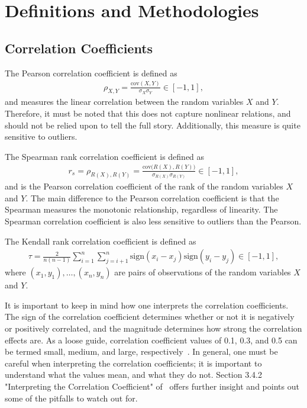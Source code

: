 \chapter{Definitions and Methodologies}
\section{Correlation Coefficients}\label{app:correlation_coefficients}
The Pearson correlation coefficient is defined as
\begin{align}
    \rho_{X,Y} = \frac{\text{cov}{(X,Y)}}{\sigma_X \sigma_Y} \in [-1, 1],
\end{align}
and measures the linear correlation between the random variables \( X \) and \( Y \).
Therefore, it must be noted that this does not capture nonlinear relations, and should not be relied upon to tell the full story.
Additionally, this measure is quite sensitive to outliers.

The Spearman rank correlation coefficient is defined as
\begin{align}
    r_s = \rho_{R(X),R(Y)} = \frac{\text{cov}{\big(R(X),R(Y)\big)}}{\sigma_{R(X)} \sigma_{R(Y)}} \in [-1, 1],
\end{align}
and is the Pearson correlation coefficient of the rank of the random variables \( X \) and \( Y \).
The main difference to the Pearson correlation coefficient is that the Spearman measures the monotonic relationship, regardless of linearity.
The Spearman correlation coefficient is also less sensitive to outliers than the Pearson.

The Kendall rank correlation coefficient is defined as
\begin{align}
    \tau = \frac{2}{n(n-1)} \sum_{i=1}^{n}\sum_{j=i+1}^{n} \text{sign}(x_i - x_j) \text{sign}(y_i - y_j) \in [-1, 1],
\end{align}
where \( (x_1, y_1), \dots, (x_n, y_n) \) are pairs of observations of the random variables \( X \) and \( Y \).

It is important to keep in mind how one interprets the correlation coefficients.
The sign of the correlation coefficient determines whether or not it is negatively or positively correlated, and the magnitude determines how strong the correlation effects are.
As a loose guide, correlation coefficient values of 0.1, 0.3, and 0.5 can be termed small, medium, and large, respectively~\cite{research_design_and_statistical_analysis}.
In general, one must be careful when interpreting the correlation coefficients; it is important to understand what the values mean, and what they do not.
Section 3.4.2 "Interpreting the Correlation Coefficient" of~\cite{research_design_and_statistical_analysis} offers further insight and points out some of the pitfalls to watch out for.

